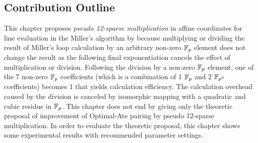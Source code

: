 \subsection{Contribution Outline}
\label{sec:ch:icisc:contriv_outline}
 This chapter proposes \textit{pseudo 12-sparse multiplication} in affine coordinates for line evaluation in the Miller's algorithm by because multiplying or dividing the result of Miller's loop calculation by an arbitrary non-zero ${\mathbb{F}}_{p}$ element does not change the result as the following final exponentiation cancels the effect of multiplication or division. 
Following the division by a non-zero ${\mathbb{F}}_{p}$ element, one of the 7 non-zero ${\mathbb{F}}_{p}$ coefficients (which is a combination of 1 ${\mathbb{F}}_{p}$ and 2 $\mathbb{F}_{p^3}$ coefficients) becomes 1 that yields calculation efficiency.
The calculation overhead caused by the division is canceled by isomorphic mapping with a quadratic and cubic residue in ${\mathbb{F}}_{p}$.
This chapter does not end by giving only the theoretic proposal of improvement of Optimal-Ate pairing by pseudo 12-sparse multiplication.
In order to evaluate the theoretic proposal, this chapter shows some experimental results with recommended parameter settings. 

